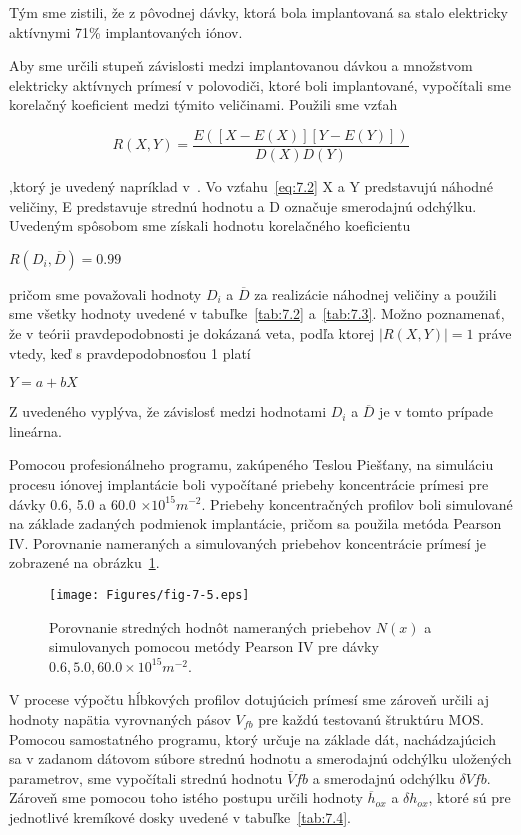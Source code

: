 Tým sme zistili, že z pôvodnej dávky, ktorá bola implantovaná sa stalo
elektricky aktívnymi 71\% implantovaných iónov.

Aby sme určili stupeň závislosti medzi implantovanou dávkou a
množstvom elektricky aktívnych prímesí v polovodiči, ktoré boli
implantované, vypočítali sme korelačný koeficient medzi týmito
veličinami. Použili sme vzťah

\begin{equation}\label{eq:7.2}
  R(X,Y) = \frac{E([X-E(X)][Y-E(Y)])}{D(X)D(Y)}
\end{equation}

,ktorý je uvedený napríklad v~\cite{7.1}. Vo vzťahu~\ref{eq:7.2} X a Y
predstavujú náhodné veličiny, E predstavuje strednú hodnotu a D
označuje smerodajnú odchýlku. Uvedeným spôsobom sme získali hodnotu
korelačného koeficientu

\centerline{$R(D_{i}, \overline{D}) = 0.99$}

pričom sme považovali hodnoty $D_{i}$ a $\overline{D}$ za realizácie
náhodnej veličiny a použili sme všetky hodnoty uvedené v
tabuľke~\ref{tab:7.2} a~\ref{tab:7.3}. Možno poznamenať, že v teórii
pravdepodobnosti je dokázaná veta, podľa ktorej $\rvert R(X,Y)\rvert =
1$ práve vtedy, keď s pravdepodobnosťou 1 platí

\centerline{$Y = a + b X$}

Z uvedeného vyplýva, že závislosť medzi hodnotami $D_{i}$ a $\overline
D$ je v tomto prípade lineárna.

\newpage
Pomocou profesionálneho programu, zakúpeného Teslou Piešťany, na
simuláciu procesu iónovej implantácie boli vypočítané priebehy
koncentrácie prímesi pre dávky 0.6, 5.0 a 60.0 $\times10^{15}m^{-2}$.
Priebehy koncentračných profilov boli simulované na základe zadaných
podmienok implantácie, pričom sa použila metóda Pearson IV\@.
Porovnanie nameraných a simulovaných priebehov koncentrácie prímesí je
zobrazené na obrázku~\ref{fig:7.5}.

\begin{figure}[h!]\centering
  \texttt{[image: Figures/fig-7-5.eps]}
  \caption[Porovnanie stredných hodnôt nameraných priebehov $N(x)$ a
    simulovanych pomocou metódy Pearson IV]{Porovnanie stredných
    hodnôt nameraných priebehov $N(x)$ a simulovanych pomocou metódy
    Pearson IV pre dávky $0.6, 5.0, 60.0 \times 10^{15}
    m^{-2}$.}\label{fig:7.5}
\end{figure}

V procese výpočtu hĺbkových profilov dotujúcich prímesí sme zároveň
určili aj hodnoty napätia vyrovnaných pásov $V_{fb}$ pre každú
testovanú štruktúru MOS\@. Pomocou samostatného programu, ktorý určuje
na základe dát, nachádzajúcich sa v zadanom dátovom súbore strednú
hodnotu a smerodajnú odchýlku uložených parametrov, sme vypočítali
strednú hodnotu $\overline V{fb}$ a smerodajnú odchýlku $\delta
V{fb}$. Zároveň sme pomocou toho istého postupu určili hodnoty
$\overline h_{ox}$ a $\delta h_{ox}$, ktoré sú pre jednotlivé
kremíkové dosky uvedené v tabuľke~\ref{tab:7.4}.


